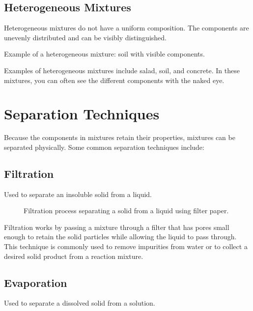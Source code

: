 \documentclass[justified,notoc]{tufte-book}
\begin{document}
\subsection{Heterogeneous Mixtures}

Heterogeneous mixtures do not have a uniform composition. The components are unevenly distributed and can be visibly distinguished.

\begin{marginfigure}[0pt]
  \caption{Example of a heterogeneous mixture: soil with visible components.}
  \label{fig:heterogeneous}
\end{marginfigure}

Examples of heterogeneous mixtures include salad, soil, and concrete. In these mixtures, you can often see the different components with the naked eye.

\FloatBarrier

\section{Separation Techniques}

Because the components in mixtures retain their properties, mixtures can be separated physically. Some common separation techniques include:

\subsection{Filtration}
Used to separate an insoluble solid from a liquid.

\begin{figure}[h]
  \caption{Filtration process separating a solid from a liquid using filter paper.}
  \label{fig:filtration}
\end{figure}

Filtration works by passing a mixture through a filter that has pores small enough to retain the solid particles while allowing the liquid to pass through. This technique is commonly used to remove impurities from water or to collect a desired solid product from a reaction mixture.

\FloatBarrier

\subsection{Evaporation}
Used to separate a dissolved solid from a solution.
\end{document}

